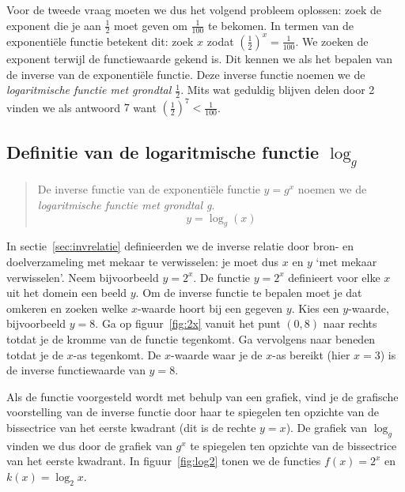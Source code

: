 Voor de  tweede vraag moeten we dus het volgend probleem oplossen: zoek de
exponent die je aan $\frac{1}{2}$ moet geven om $\frac{1}{100}$ te
bekomen. In termen van de exponenti\"{e}le functie betekent dit:
zoek $x$ zodat $\left(\frac{1}{2}\right)^{x}=\frac{1}{100}$. We zoeken de exponent terwijl de functiewaarde gekend is. Dit
kennen we als het bepalen van de inverse van de exponenti\"{e}le functie. Deze inverse
functie noemen we de \emph{logaritmische functie met grondtal
$\frac{1}{2}$}. Mits wat geduldig blijven delen door 2 vinden we als
antwoord $7$ want $\left(\frac{1}{2}\right)^{7}<\frac{1}{100}$.

\subsection[Definitie van de logaritmische functie $\log_{g}$]
{Definitie van de logaritmische functie
\boldmath$\log_{g}$\unboldmath}
\begin{quote}
   De inverse functie  van de exponenti\"ele 
functie $y=g^{x}$ noemen we de \emph{logaritmische functie met grondtal g}.
\[
y=\log_{g}(x)
\]
\end{quote}
In sectie~\ref{sec:invrelatie} definieerden we de inverse relatie door bron- en doelverzameling met mekaar te verwisselen: je moet dus $x$ en $y$ `met mekaar verwisselen'. 
Neem bijvoorbeeld $y=2^x$. De functie $y=2^x$ definieert voor elke $x$ uit het domein een beeld $y$. Om de inverse functie te bepalen moet je dat omkeren en zoeken welke $x$-waarde hoort bij een gegeven $y$. Kies een $y$-waarde, bijvoorbeeld $y=8$. Ga op figuur~\ref{fig:2x} vanuit het punt $(0,8)$ naar rechts totdat je de kromme van de functie tegenkomt. Ga vervolgens naar beneden totdat je de $x$-as tegenkomt. De $x$-waarde waar je de $x$-as bereikt (hier $x=3$) is de inverse functiewaarde van $y=8$. 

Als de functie voorgesteld wordt met behulp van een grafiek, vind je de grafische voorstelling van de inverse functie door haar te spiegelen ten opzichte van de bissectrice van het eerste kwadrant (dit is de rechte $y=x$).  De grafiek van $\log_{g}$ vinden we dus door de grafiek van $g^{x}$ te spiegelen ten opzichte van de bissectrice van het
eerste kwadrant. In figuur~\ref{fig:log2} tonen we de functies $f(x)=2^x$ en $k(x)=\log_2x$.

